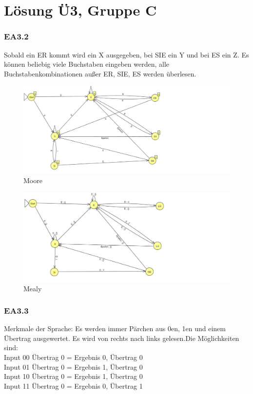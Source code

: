 \documentclass[12pt,twoside,a4paper]{article}
\author{Thorben Schomacker}
\author{Ferdinand Trendelenburg}
\begin{document}
\part*{Lösung Ü3, Gruppe C}

\section{EA3.2}

Sobald ein ER kommt wird ein X ausgegeben, bei SIE ein Y und bei ES ein Z. 
Es können beliebig viele Buchstaben eingeben werden, alle Buchstabenkombinationen außer ER, SIE, ES werden überlesen.

\begin{figure}[!htb]
\centering
\includegraphics[width=180mm]{32moore.jpg}
\caption{Moore \label{overflow}}
\end{figure}

\begin{figure}[!htb]
\centering
\includegraphics[width=180mm]{32mealy.jpg}
\caption{Mealy \label{overflow}}
\end{figure}

\newpage 
\section{EA3.3}

Merkmale der Sprache: Es werden immer Pärchen aus 0en, 1en und einem Übertrag ausgewertet. Es wird von rechts nach links gelesen.Die Möglichkeiten sind: \\
Input 00 Übertrag 0 = Ergebnis 0, Übertrag 0 \\
Input 01 Übertrag 0 = Ergebnis 1, Übertrag 0 \\
Input 10 Übertrag 0 = Ergebnis 1, Übertrag 0 \\
Input 11 Übertrag 0 = Ergebnis 0, Übertrag 1 \\
\end{document}
